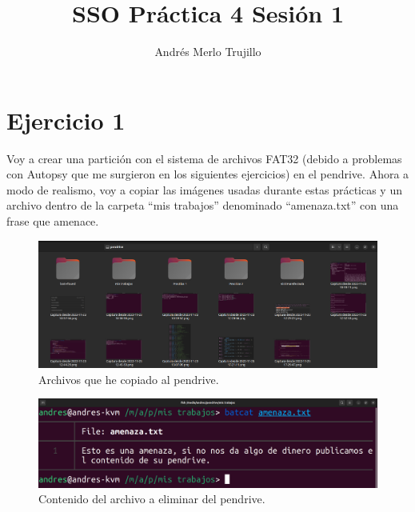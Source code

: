 \documentclass{article}
\title{SSO Práctica 4 Sesión 1}
\author{Andrés Merlo Trujillo}
\date{}
\begin{document}
\maketitle

\tableofcontents

\newpage

\section*{Ejercicio 1}

Voy a crear una partición con el sistema de archivos FAT32 (debido a problemas con Autopsy que me surgieron en los siguientes ejercicios) en el pendrive. Ahora a modo de realismo, voy a copiar las imágenes usadas durante estas prácticas y un archivo dentro de la carpeta ``mis trabajos'' denominado ``amenaza.txt'' con una frase que amenace.

\begin{figure}[H]
    \centering
    \includegraphics[width=\textwidth]{imagenes/Captura desde 2022-12-02 17-34-22.png}
    \caption{Archivos que he copiado al pendrive.}
\end{figure}

\begin{figure}[H]
    \centering
    \includegraphics[width=\textwidth]{imagenes/Captura desde 2022-12-02 17-35-50.png}
    \caption{Contenido del archivo a eliminar del pendrive.}
\end{figure}
\end{document}
